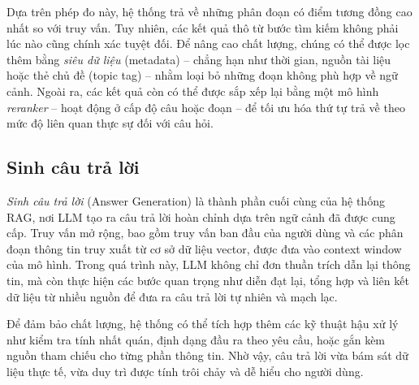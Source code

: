 Dựa trên phép đo này, hệ thống trả về những phân đoạn có điểm tương đồng cao nhất so với truy vấn. Tuy nhiên, các kết quả thô từ bước tìm kiếm không phải lúc nào cũng chính xác tuyệt đối. Để nâng cao chất lượng, chúng có thể được lọc thêm bằng \emph{siêu dữ liệu} (metadata) -- chẳng hạn như thời gian, nguồn tài liệu hoặc thẻ chủ đề (topic tag) -- nhằm loại bỏ những đoạn không phù hợp về ngữ cảnh. Ngoài ra, các kết quả còn có thể được sắp xếp lại bằng một mô hình \emph{reranker} -- hoạt động ở cấp độ câu hoặc đoạn -- để tối ưu hóa thứ tự trả về theo mức độ liên quan thực sự đối với câu hỏi.

\subsection{Sinh câu trả lời}

\emph{Sinh câu trả lời} (Answer Generation) là thành phần cuối cùng của hệ thống RAG, nơi LLM tạo ra câu trả lời hoàn chỉnh dựa trên ngữ cảnh đã được cung cấp. Truy vấn mở rộng, bao gồm truy vấn ban đầu của người dùng và các phân đoạn thông tin truy xuất từ cơ sở dữ liệu vector, được đưa vào context window của mô hình. Trong quá trình này, LLM không chỉ đơn thuần trích dẫn lại thông tin, mà còn thực hiện các bước quan trọng như diễn đạt lại, tổng hợp và liên kết dữ liệu từ nhiều nguồn để đưa ra câu trả lời tự nhiên và mạch lạc.

Để đảm bảo chất lượng, hệ thống có thể tích hợp thêm các kỹ thuật hậu xử lý như kiểm tra tính nhất quán, định dạng đầu ra theo yêu cầu, hoặc gắn kèm nguồn tham chiếu cho từng phần thông tin. Nhờ vậy, câu trả lời vừa bám sát dữ liệu thực tế, vừa duy trì được tính trôi chảy và dễ hiểu cho người dùng.
